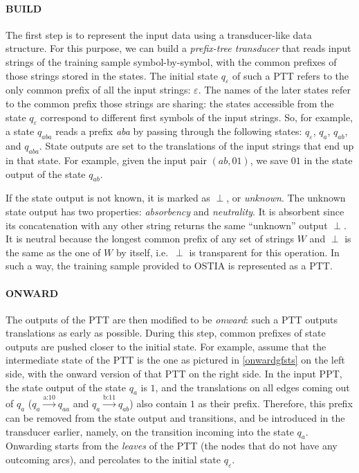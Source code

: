 \paragraph{BUILD}

The first step is to represent the input data using a transducer-like data structure.
For this purpose, we can build a \emph{prefix-tree transducer} that reads input strings of the training sample symbol-by-symbol, with the common prefixes of those strings stored in the states.
The initial state $q_\varepsilon$ of such a PTT refers to the only common prefix of all the input strings: $\varepsilon$.
The names of the later states refer to the common prefix those strings are sharing: the states accessible from the state $q_\varepsilon$ correspond to different first symbols of the input strings.
So, for example, a state $q_{aba}$ reads a prefix \emph{aba} by passing through the following states: $q_\varepsilon$, $q_{a}$, $q_{ab}$, and $q_{aba}$.
State outputs are set to the translations of the input strings that end up in that state.
For example, given the input pair $(ab, 01)$, we save $01$ in the state output of the state $q_{ab}$.

If the state output is not known, it is marked as $\perp$, or \emph{unknown}.
The unknown state output has two properties: \emph{absorbency} and \emph{neutrality}.
It is absorbent since its concatenation with any other string returns the same ``unknown'' output $\perp$.
It is neutral because the longest common prefix of any set of strings $W$ and $\perp$ is the same as the one of $W$ by itself, i.e.\  $\perp$ is transparent for this operation.
In such a way, the training sample provided to OSTIA is represented as a PTT.


\paragraph{ONWARD}

The outputs of the PTT are then modified to be \emph{onward}: such a PTT outputs translations as early as possible.
During this step, common prefixes of state outputs are pushed closer to the initial state.
For example, assume that the intermediate state of the PTT is the one as pictured in \ref{onwardgfsts} on the left side, with the onward version of that PTT on the right side.
In the input PPT, the state output of the state $q_a$ is $1$, and the translations on all edges coming out of $q_a$ ($q_a\xrightarrow{\text{a:10}}q_{aa}$ and $q_a\xrightarrow{\text{b:11}}q_{ab}$) also contain $1$ as their prefix.
Therefore, this prefix can be removed from the state output and transitions, and be introduced in the transducer earlier, namely, on the transition incoming into the state $q_a$.
Onwarding starts from the \emph{leaves} of the PTT (the nodes that do not have any outcoming arcs), and percolates to the initial state $q_\varepsilon$.





